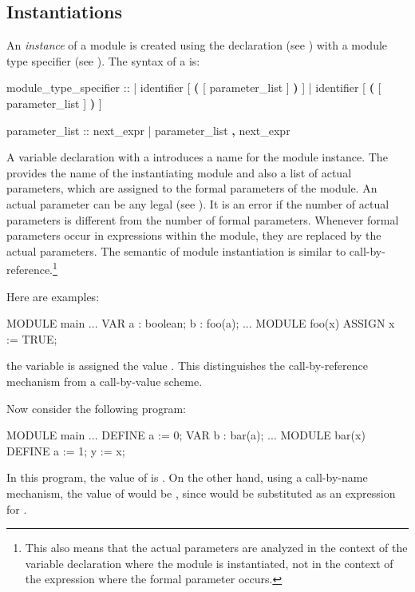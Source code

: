 \subsection { Instantiations}
\label{MODULE Instantiations}

An \emph{instance} of a module is created using the 
declaration (see ) with a module type specifier
(see ).
%
The syntax of a  is:

\begin{Grammar}
module_type_specifier ::     
      | identifier [ \textbf{(} [ parameter_list ] \textbf{)} ]
      |  identifier [ \textbf{(} [ parameter_list ] \textbf{)} ]

parameter_list ::
        next_expr
      | parameter_list \textbf{,} next_expr
\end{Grammar}
%
A variable declaration with a 
introduces a name for the module instance. 
%
The  provides the name of the
instantiating module and also a list of actual parameters, which are
assigned to the formal parameters of the module.
%
An actual parameter can be any legal  (see
). 
%
It is an error if the number of actual parameters is different from
the number of formal parameters. 
%
Whenever formal parameters occur in expressions within the module,
they are replaced by the actual parameters. 
%
The semantic of module instantiation is similar to
call-by-reference.\footnote{This also means that the actual parameters
are analyzed in the context of the variable declaration where the module
is instantiated, not in the context of the expression where the formal
parameter occurs.}

Here are examples:
%
\begin{nusmvCode}
MODULE main
...
 VAR
  a : boolean;
  b : foo(a);
...
MODULE foo(x)
 ASSIGN
   x := TRUE;
\end{nusmvCode}
%
the variable  is assigned the value . 
%
This distinguishes the call-by-reference mechanism from a
call-by-value scheme.

\noindent Now consider the following program:
%
\begin{nusmvCode}
MODULE main
...
 DEFINE
   a := 0;
 VAR
   b : bar(a);
...
MODULE bar(x)
 DEFINE
   a := 1;
   y := x;
\end{nusmvCode}
%
In this program, the value of  is . On the other hand,
using a call-by-name mechanism, the value of  would be
, since  would be substituted as an expression for
.


